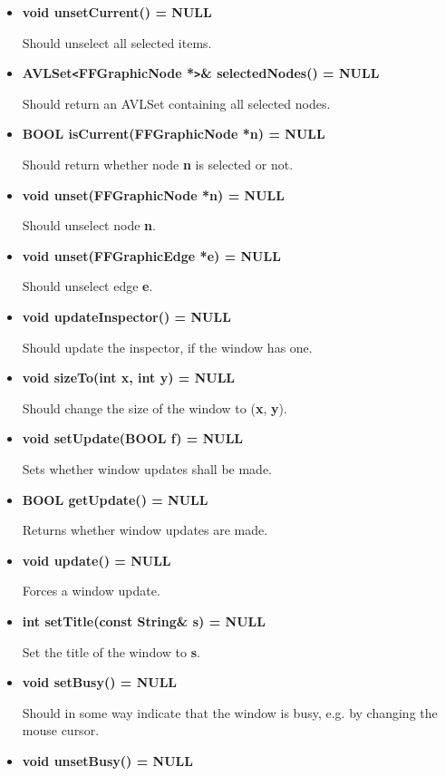 \begin{itemize}
\item{\bf void unsetCurrent() = NULL}
  
  Should unselect all selected items.
  
\item{\bf AVLSet\verb|<|FFGraphicNode *\verb|>|\& selectedNodes()
    = NULL}
  
  Should return an AVLSet containing all selected nodes.

\item{\bf BOOL isCurrent(FFGraphicNode *n) = NULL}
  
  Should return whether node {\bf n} is selected or not.
  
\item{\bf void unset(FFGraphicNode *n) = NULL}
  
  Should unselect node {\bf n}.

\item{\bf void unset(FFGraphicEdge *e) = NULL}
  
  Should unselect edge {\bf e}.

\item{\bf void updateInspector() = NULL}
  
  Should update the inspector, if the window has one.

\item{\bf void sizeTo(int x, int y) = NULL}

Should change the size of the window to ({\bf x}, {\bf y}).
  
\item{\bf void setUpdate(BOOL f) = NULL}

Sets whether window updates shall be made.

\item{\bf BOOL getUpdate() = NULL}

Returns whether window updates are made.

\item{\bf void update() = NULL}

Forces a window update.

\item{\bf int setTitle(const String\& s) = NULL}

Set the title of the window to {\bf s}.

\item{\bf void setBusy() = NULL}
  
  Should in some way indicate that the window is busy, e.g. by
  changing the mouse cursor.

\item{\bf void unsetBusy() = NULL}
        

\end{itemize}
